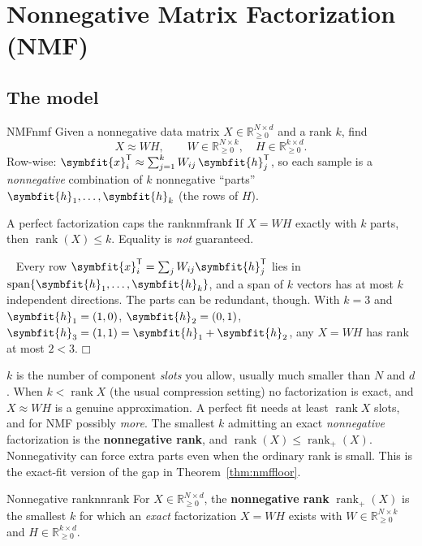 \documentclass[11pt]{article}
\newcommand{\bm}[1]{\symbfit{#1}}
\newenvironment{proofsketch}{\par\noindent{\itshape Proof.}\ }{\hfill$\mdlgwhtsquare$\par}
\newcommand{\R}{\mathbb{R}}
\newcommand{\vx}{\bm{x}}
\newcommand{\vh}{\bm{h}}
\newcommand{\T}{^{\mathsf T}}
\newcommand{\rank}{\operatorname{rank}}
\newcommand{\spn}{\operatorname{span}}
\begin{document}
\section{Nonnegative Matrix Factorization (NMF)}

\subsection{The model}

\begin{definition}{NMF}{nmf}
Given a nonnegative data matrix $X\in\R_{\ge0}^{N\times d}$ and a rank $k$, find
\[
X\approx WH,\qquad W\in\R_{\ge0}^{N\times k},\quad H\in\R_{\ge0}^{k\times d}.
\]
Row-wise: $\vx_i\T\approx\sum_{j=1}^k W_{ij}\,\vh_j\T$, so each sample is a
\emph{nonnegative} combination of $k$ nonnegative ``parts'' $\vh_1,\dots,\vh_k$ (the rows of $H$).
\end{definition}

\begin{proposition}{A perfect factorization caps the rank}{nmfrank}
If $X=WH$ exactly with $k$ parts, then $\rank(X)\le k$. Equality is \emph{not} guaranteed.
\end{proposition}
\begin{proofsketch}
Every row $\vx_i\T=\sum_jW_{ij}\vh_j\T$ lies in $\spn\{\vh_1,\dots,\vh_k\}$, and a span of $k$ vectors has
at most $k$ independent directions. The parts can be redundant, though. With $k=3$ and
$\vh_1=(1,0)$, $\vh_2=(0,1)$, $\vh_3=(1,1)=\vh_1+\vh_2$, any $X=WH$ has rank at most $2<3$.
\end{proofsketch}

\begin{intuition}
$k$ is the number of component \emph{slots} you allow, usually much smaller than $N$ and $d$.
When $k<\rank X$ (the usual compression setting) no factorization is exact, and $X\approx WH$ is a
genuine approximation. A perfect fit needs at least $\rank X$ slots, and for NMF possibly
\emph{more}. The smallest $k$ admitting an exact \emph{nonnegative} factorization is the
\textbf{nonnegative rank}, and $\rank(X)\le\operatorname{rank}_+(X)$. Nonnegativity can force extra parts
even when the ordinary rank is small. This is the exact-fit version of the gap in
Theorem~\ref{thm:nmffloor}.
\end{intuition}

\begin{definition}{Nonnegative rank}{nnrank}
For $X\in\R^{N\times d}_{\ge0}$, the \textbf{nonnegative rank} $\operatorname{rank}_+(X)$ is the smallest $k$ for which an
\emph{exact} factorization $X=WH$ exists with $W\in\R^{N\times k}_{\ge0}$ and $H\in\R^{k\times d}_{\ge0}$.
\end{definition}
\end{document}
